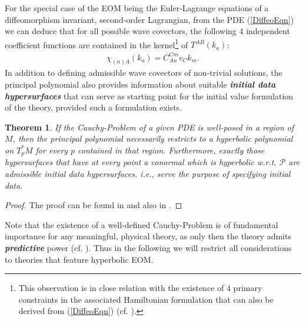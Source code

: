 \documentclass[%
 reprint,
nofootinbib,
 amsmath,amssymb,
 aps,
 prd,
floatfix,
]{revtex4-2}
\newtheorem{theorem}{Theorem}
\begin{document}
For the special case of the EOM being the Euler-Lagrange equations of a diffeomorphism invariant, second-order Lagrangian, from the PDE (\ref{DiffeoEqn}) we can deduce that for all possible wave covectors, the following $4$ independent coefficient functions are contained in the kernel\footnote{This observation is in close relation with the existence of $4$ primary constraints in the associated Hamiltonian formulation that can also be derived from (\ref{DiffeoEqn}) (cf. \cite{TobiMaster}).}  of $T^{AB}(k_a)$: 
\begin{align}
   \chi_{(n)A}(k_a) =  C_{An}^{Cm}v_Ck_m.
\end{align}
In addition to defining admissible wave covectors of non-trivial solutions, the principal polynomial also provides information about suitable \textit{\textbf{initial data hypersurfaces}} that can serve as starting point for the initial value formulation of the theory, provided such a formulation exists.
\begin{theorem}
If the Cauchy-Problem of a given PDE is well-posed in a region of $M$, then the principal polynomial necessarily restricts to a hyperbolic polynomial on $T_p^{\ast}M$ for every $p$ contained in that region. Furthermore, exactly those hypersurfaces that have at every point a conormal which is hyperbolic w.r.t. $\mathcal{P}$ are admissible initial data hypersurfaces, i.e., serve the purpose of specifying initial data.
\end{theorem}
\begin{proof}
The proof can be found in \cite{Hormander1977} and also in \cite{Ivrii_1974}.
\end{proof}
Note that the existence of a well-defined Cauchy-Problem is of fundamental importance for any meaningful, physical theory, as only then the theory admits \textit{\textbf{predictive}} power (cf. \cite{Rivera}).  Thus in the following we will restrict all considerations to theories that feature hyperbolic EOM.
\end{document}

